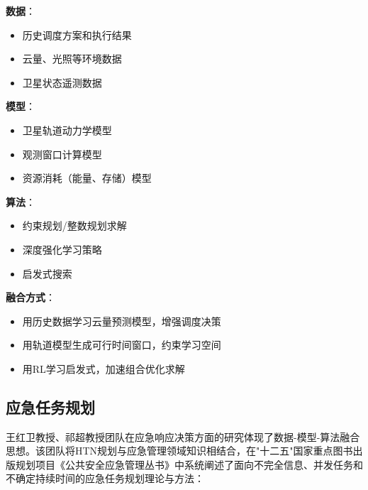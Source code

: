 \documentclass[12pt,a4paper]{ctexart}
\begin{document}
\begin{applicationbox}[卫星任务调度中的三元融合]
\textbf{数据}：
\begin{itemize}
    \item 历史调度方案和执行结果
    \item 云量、光照等环境数据
    \item 卫星状态遥测数据
\end{itemize}

\textbf{模型}：
\begin{itemize}
    \item 卫星轨道动力学模型
    \item 观测窗口计算模型
    \item 资源消耗（能量、存储）模型
\end{itemize}

\textbf{算法}：
\begin{itemize}
    \item 约束规划/整数规划求解
    \item 深度强化学习策略
    \item 启发式搜索
\end{itemize}

\textbf{融合方式}：
\begin{itemize}
    \item 用历史数据学习云量预测模型，增强调度决策
    \item 用轨道模型生成可行时间窗口，约束学习空间
    \item 用RL学习启发式，加速组合优化求解
\end{itemize}
\end{applicationbox}

\subsection{应急任务规划}

王红卫教授、祁超教授团队在应急响应决策方面的研究体现了数据-模型-算法融合思想。该团队将HTN规划与应急管理领域知识相结合，在"十二五"国家重点图书出版规划项目《公共安全应急管理丛书》中系统阐述了面向不完全信息、并发任务和不确定持续时间的应急任务规划理论与方法：
\end{document}

